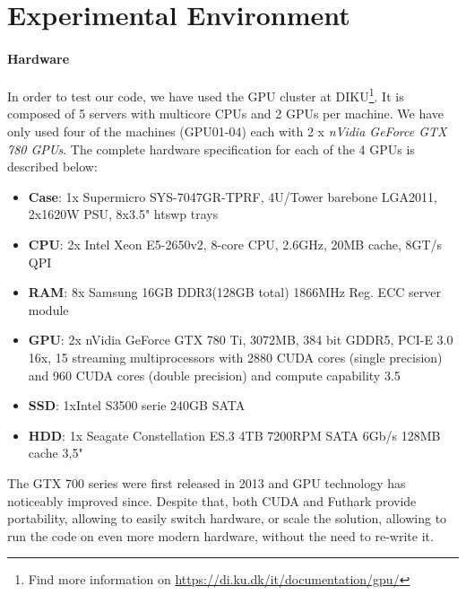 \section{Experimental Environment}\label{section:experimental:enviornment}
\paragraph{Hardware}
In order to test our code, we have used the GPU cluster at DIKU\footnote{Find more information on \url{https://di.ku.dk/it/documentation/gpu/}}. It is composed of 5 servers with multicore CPUs and 2 GPUs per machine. We have only used four of the machines (GPU01-04) each with 2 x \textit{nVidia GeForce GTX 780 GPUs}. The complete hardware specification for each of the 4 GPUs is described below:
\begin{itemize}
\item \textbf{Case}: 1x Supermicro SYS-7047GR-TPRF, 4U/Tower barebone LGA2011, 2x1620W PSU, 8x3.5" htswp trays

\item \textbf{CPU}: 2x Intel Xeon E5-2650v2, 8-core CPU, 2.6GHz, 20MB cache, 8GT/s QPI

\item \textbf{RAM}: 8x Samsung 16GB DDR3(128GB total) 1866MHz Reg. ECC server module

\item \textbf{GPU}: 2x nVidia GeForce GTX 780 Ti, 3072MB, 384 bit GDDR5, PCI-E 3.0 16x, 15 streaming multiprocessors with 2880 CUDA cores (single precision) and 960 CUDA cores (double precision) and compute capability 3.5

\item \textbf{SSD}: 1xIntel S3500 serie 240GB SATA

\item \textbf{HDD}: 1x	Seagate Constellation ES.3 4TB 7200RPM SATA 6Gb/s 128MB cache 3,5"
\end{itemize}

The GTX 700 series were first released in 2013 and GPU technology has noticeably improved since. Despite that, both CUDA and Futhark provide portability, allowing to easily switch hardware, or scale the solution, allowing to run the code on even more modern hardware, without the need to re-write it.

